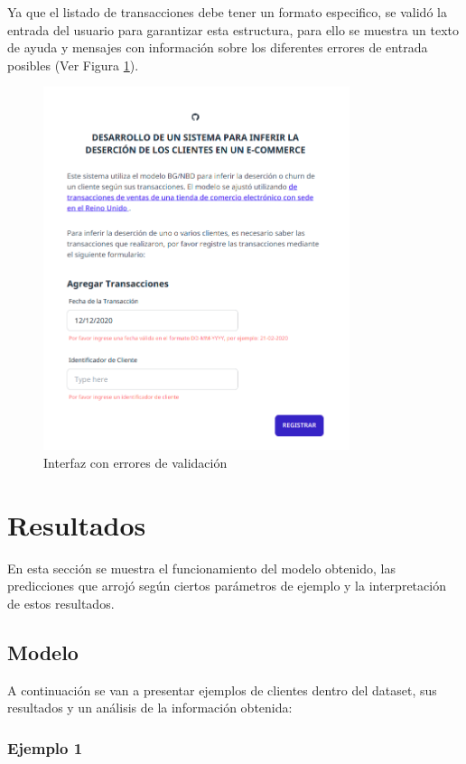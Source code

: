 Ya que el listado de transacciones debe tener un formato especifico, se validó la entrada del usuario para garantizar esta estructura, para ello se muestra un texto de ayuda y mensajes con información sobre los diferentes errores de entrada posibles (Ver Figura \ref{fig:ui1}).

\begin{figure}[H]
	\centering \includegraphics[width=0.80\textwidth]{images/6.png}
	\caption{Interfaz con errores de validación}
	\label{fig:ui1}
\end{figure}

\section{Resultados}

En esta sección se muestra el funcionamiento del modelo obtenido, las predicciones que arrojó según ciertos parámetros de ejemplo y la interpretación de estos resultados.

\subsection{Modelo}

A continuación se van a presentar ejemplos de clientes dentro del dataset, sus resultados y un análisis de la información obtenida:

\subsubsection{Ejemplo 1}

